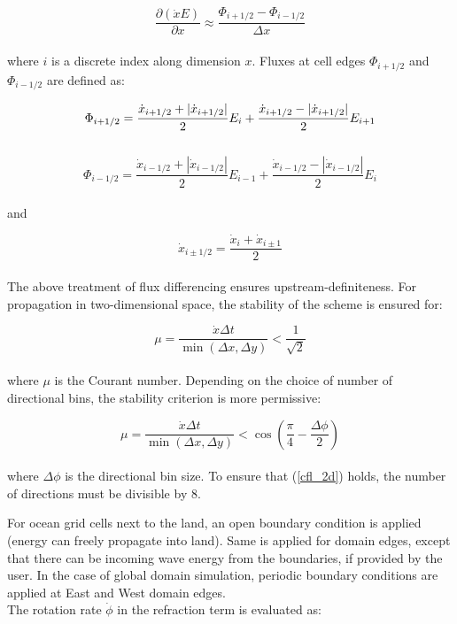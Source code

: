 \documentclass[letterpaper]{article}
\numberwithin{equation}{section}
\begin{document}
\begin{equation}
\dfrac{\partial (\dot{x}E)}{\partial x} \approx \dfrac{\Phi_{i+1/2}-\Phi_{i-1/2}}{\Delta x}\label{advection} 
\end{equation}
\\
where $i$ is a discrete index along dimension $x$. 
Fluxes at cell edges $\Phi_{i+1/2}$ and $\Phi_{i-1/2}$ are defined as:

\begin{equation}
\Phi_{i+1/2}=\dfrac{\dot{x}_{i+1/2}+|\dot{x}_{i+1/2}|}{2}E_{i}+\dfrac{\dot{x}_{i+1/2}-|\dot{x}_{i+1/2}|}{2}E_{i+1}\label{fluxout} \\
\end{equation}
\\
\begin{equation}
\Phi_{i-1/2}=\dfrac{\dot{x}_{i-1/2}+|\dot{x}_{i-1/2}|}{2}E_{i-1}+\dfrac{\dot{x}_{i-1/2}-|\dot{x}_{i-1/2}|}{2}E_{i}\label{fluxin}
\end{equation} 
\\
and 

\begin{equation}
\dot{x}_{i\pm 1/2} = \dfrac{\dot{x}_{i}+\dot{x}_{i\pm 1}}{2}\label{average}
\end{equation}
\\
The above treatment of flux differencing ensures upstream-definiteness.
For propagation in two-dimensional space, the stability of the scheme is ensured for:

\begin{equation}
\mu = \dfrac{\dot{x}\Delta t}{\min{(\Delta x,\Delta y)}} < \dfrac{1}{\sqrt{2}}
\end{equation}
\\
where $\mu$ is the Courant number.
Depending on the choice of number of directional bins, the stability criterion is more permissive:

\begin{equation}
\mu = \dfrac{\dot{x}\Delta t}{\min{(\Delta x,\Delta y)}} < 
\cos{\left(\dfrac{\pi}{4}
-\dfrac{\Delta \phi}{2}\right)}\label{cfl_2d}
\end{equation}
\\
where $\Delta \phi$ is the directional bin size. 
To ensure that (\ref{cfl_2d}) holds, the number of directions must be divisible by $8$.

For ocean grid cells next to the land, an open boundary condition is applied
(energy can freely propagate into land). Same is applied for domain edges, 
except that there can be incoming wave energy from the boundaries, if provided by the user.
In the case of global domain simulation, periodic boundary conditions are applied at East and West domain edges.
\\
The rotation rate $\dot{\phi}$ in the refraction term is evaluated as:
\end{document}
